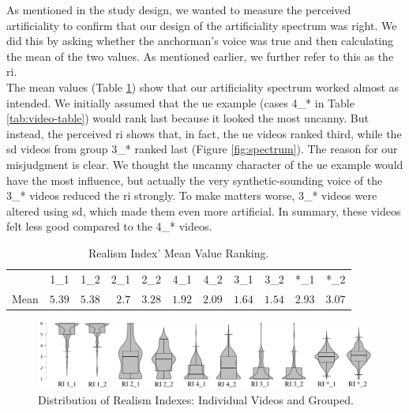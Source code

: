 \documentclass[
  a4paper,  %
  twoside,  %
  bibliography=totoc,
  headsepline,
  cleardoublepage=empty,
  parskip=half,
  draft=false
]{scrbook}
\begin{document}
As mentioned in the study design, we wanted to measure the perceived artificiality to confirm that our design of the artificiality spectrum was right. We did this by asking whether the anchorman's voice was true and then calculating the mean of the two values. As mentioned earlier, we further refer to this as the \gls{ri}. \\
The mean values (Table \ref{tab:RIs-mean}) show that our artificiality spectrum worked almost as intended. We initially assumed that the \gls{ue} example (cases 4\_* in Table \ref{tab:video-table}) would rank last because it looked the most uncanny. But instead, the perceived \gls{ri} shows that, in fact, the \gls{ue} videos ranked third, while the \gls{sd} videos from group 3\_* ranked last (Figure \ref{fig:spectrum}). The reason for our misjudgment is clear. We thought the uncanny character of the \gls{ue} example would have the most influence, but actually the very synthetic-sounding voice of the 3\_* videos reduced the \gls{ri} strongly. To make matters worse, 3\_* videos were altered using \gls{sd}, which made them even more artificial. In summary, these videos felt less good compared to the 4\_* videos.

\begin{table}[h]
	\centering
	\caption{Realism Index' Mean Value Ranking.}
	\label{tab:RIs-mean}
	{
		\begin{tabular}{lrrrrrrrrrr}
			\toprule
			 & 1\_1 & 1\_2 & 2\_1 & 2\_2 & 4\_1 & 4\_2 & 3\_1 & 3\_2 & *\_1 & *\_2 \\
			\cmidrule[0.4pt]{1-11}
			Mean & $5.39$ & $5.38$ & $2.7$ & $3.28$ & $1.92$ & $2.09$ & $1.64$ & $1.54$  & $2.93$ & $3.07$\\
			\bottomrule
		\end{tabular}
	}
\end{table}
\begin{figure}[h]
  \includegraphics[width=1\textwidth]{graphics/statistics/RIs/RI_compilation.png}
  \caption{Distribution of Realism Indexes: Individual Videos and Grouped.}
  \label{fig:all-RIs}
\end{figure}
\end{document}
